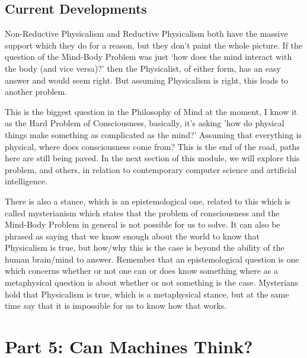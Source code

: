 \section{Current Developments}
Non-Reductive Physicalism and Reductive Physicalism both have the massive support which they do for a reason, but they don't paint the whole picture. If the question of the Mind-Body Problem was just ‘how does the mind interact with the body (and vice versa)?' then the Physicalist, of either form, has an easy answer and would seem right. But assuming Physicalism is right, this leads to another problem. 


This is the biggest question in the Philosophy of Mind at the moment, I know it as the Hard Problem of Consciousness, basically, it's asking 'how do physical things make something as complicated as the mind?' Assuming that everything is physical, where does consciousness come from? This is the end of the road, paths here are still being paved. In the next section of this module, we will explore this problem, and others, in relation to contemporary computer science and artificial intelligence.

There is also a stance, which is an epistemological one, related to this which is called mysterianism which states that the problem of consciousness and the Mind-Body Problem in general is not possible for us to solve. It can also be phrased as saying that we know enough about the world to know that Physicalism is true, but how/why this is the case is beyond the ability of the human brain/mind to answer. Remember that an epistemological question is one which concerns whether or not one can or does know something where as a metaphysical question is about whether or not something is the case. Mysterians hold that Physicalism is true, which is a metaphysical stance, but at the same time say that it is impossible for us to know how that works.


\chapter{Part 5: Can Machines Think?}
